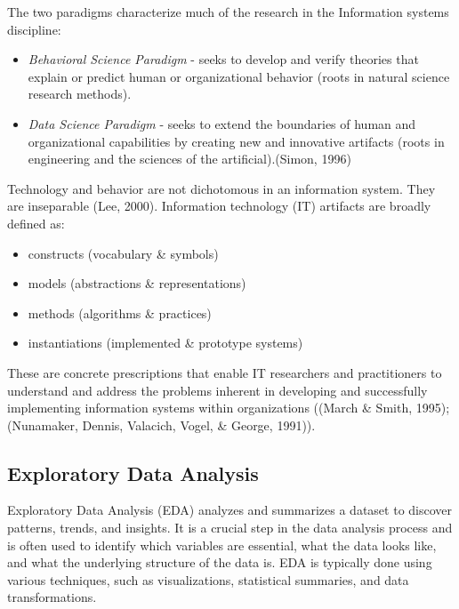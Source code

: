 \documentclass[print]{nuthesis}
\providecommand{\tightlist}{%
  \setlength{\itemsep}{0pt}\setlength{\parskip}{0pt}}
\begin{document}
The two paradigms characterize much of the research in the Information systems discipline:

\begin{itemize}
\tightlist
\item
  \emph{Behavioral Science Paradigm} - seeks to develop and verify theories that explain or predict human or organizational behavior (roots in natural science research methods).
\item
  \emph{Data Science Paradigm} - seeks to extend the boundaries of human and organizational capabilities by creating new and innovative artifacts (roots in engineering and the sciences of the artificial).(Simon, 1996)
\end{itemize}

Technology and behavior are not dichotomous in an information system. They are inseparable (Lee, 2000). Information technology (IT) artifacts are broadly defined as:

\begin{itemize}
\tightlist
\item
  constructs (vocabulary \& symbols)
\item
  models (abstractions \& representations)
\item
  methods (algorithms \& practices)
\item
  instantiations (implemented \& prototype systems)
\end{itemize}

These are concrete prescriptions that enable IT researchers and practitioners to understand and address the problems inherent in developing and successfully implementing information systems within organizations ((March \& Smith, 1995); (Nunamaker, Dennis, Valacich, Vogel, \& George, 1991)).

\hypertarget{exploratory-data-analysis}{%
\subsection{Exploratory Data Analysis}\label{exploratory-data-analysis}}

Exploratory Data Analysis (EDA) analyzes and summarizes a dataset to discover patterns, trends, and insights. It is a crucial step in the data analysis process and is often used to identify which variables are essential, what the data looks like, and what the underlying structure of the data is. EDA is typically done using various techniques, such as visualizations, statistical summaries, and data transformations.
\end{document}
